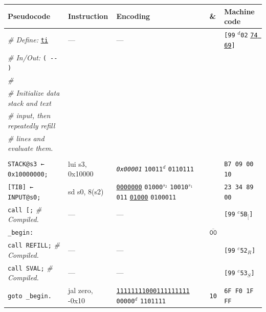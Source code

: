 \documentclass[a4paper,12pt,final]{article}
\begin{document}
\begin{table}[!htbp] \begin{adjustwidth}{-1cm}{-1cm} \fontsize{8}{9.600000}\selectfont
\begin{center}
\begin{tabular}{l|ll|l|l}
\textbf{Pseudocode} & \textbf{Instruction} & \textbf{Encoding} & \textbf{\&} & \textbf{Machine code}\\[0pt]
\hline
\emph{\# Define:} \uline{\texttt{ti}} & --- & --- &  & \texttt{[99} \(^{d}\)​\texttt{02} \uline{\texttt{74 69}}​\texttt{]}\\[0pt]
\emph{\# In/Out:} \texttt{( -{}-{} )} &  &  &  & \\[0pt]
\emph{\#} &  &  &  & \\[0pt]
\emph{\# Initialize data stack and text} &  &  &  & \\[0pt]
\emph{\# input, then repeatedly refill} &  &  &  & \\[0pt]
\emph{\# lines and evaluate them.} &  &  &  & \\[0pt]
 &  &  &  & \\[0pt]
\hspace{1.053000em} \texttt{STACK@s3 ← 0x10000000;} & lui s3, 0x10000 & \emph{\texttt{0x00001}}                                                  \texttt{10011}​\(^{d}\)  \texttt{0110111} &  & \texttt{B7 09 00 10}\\[0pt]
\hspace{1.053000em} \texttt{[TIB] ← INPUT@s0;} & sd s0, 8(s2) & \uline{\texttt{0000000}} \texttt{01000}​\(^{s_{2}}\) \texttt{10010}​\(^{s_{1}}\) \texttt{011} \uline{\texttt{01000}} \texttt{0100011} &  & \texttt{23 34 89 00}\\[0pt]
\hspace{1.053000em} \texttt{call [;}  \emph{\# Compiled.} & --- & --- &  & \texttt{[99} \(^{c}\)​\texttt{5B}​\(_{[}\)​\texttt{]}\\[0pt]
\texttt{\_begin:} &  &  & \(\overline{\texttt{00}}\) & \\[0pt]
\hspace{1.053000em} \texttt{call REFILL;}  \hspace{0.000000em}​\emph{\# Compiled.} & --- & --- &  & \texttt{[99} \(^{c}\)​\texttt{52}​\(_{R}\)​\texttt{]}\\[0pt]
\hspace{1.053000em} \texttt{call SVAL;}    \hspace{1.053000em}​\emph{\# Compiled.} & --- & --- &  & \texttt{[99} \(^{c}\)​\texttt{53}​\(_{S}\)​\texttt{]}\\[0pt]
\hspace{1.053000em} \texttt{goto \_begin.} & jal zero, -0x10 & \uline{\texttt{11111111000111111111}}                                     \texttt{00000}​\(^{d}\)  \texttt{1101111} & \texttt{10} & \texttt{6F F0 1F FF}\\[0pt]
\end{tabular}

\end{center}
\normalsize \end{adjustwidth} \end{table} \vspace{0}
\end{document}

